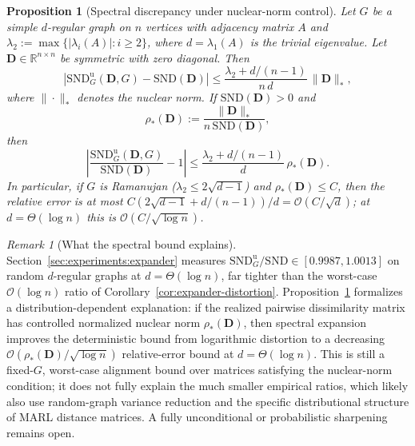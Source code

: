 \documentclass{article}
\theoremstyle{plain}
\newtheorem{proposition}[theorem]{Proposition}
\theoremstyle{definition}
\theoremstyle{remark}
\newtheorem{remark}[theorem]{Remark}
\newcommand{\R}{\mathbb{R}}
\newcommand{\SND}{\ensuremath{\mathrm{SND}}}
\newcommand{\SNDG}{\mathrm{SND}_{G}}
\newcommand{\abs}[1]{\left\lvert #1 \right\rvert}
\begin{document}
\begin{proposition}[Spectral discrepancy under nuclear-norm control]
\label{prop:spectral-nuclear-discrepancy}
Let $G$ be a simple $d$-regular graph on $n$ vertices with adjacency
matrix $A$ and
$\lambda_2:=\max\{|\lambda_i(A)|: i\geq 2\}$, where
$d=\lambda_1(A)$ is the trivial eigenvalue. Let
$\mathbf{D}\in\R^{n\times n}$ be symmetric with zero diagonal. Then
\begin{equation}
\label{eq:spectral-nuclear-absolute}
\abs{\SNDG^{\mathrm{u}}(\mathbf{D},G)-\SND(\mathbf{D})}
\leq
\frac{\lambda_2+d/(n-1)}{n\,d}\,\|\mathbf{D}\|_* ,
\end{equation}
where $\|\cdot\|_*$ denotes the nuclear norm. If $\SND(\mathbf{D})>0$
and
\[
\rho_*(\mathbf{D})
:=
\frac{\|\mathbf{D}\|_*}{n\,\SND(\mathbf{D})},
\]
then
\begin{equation}
\label{eq:spectral-nuclear-relative}
\abs{\frac{\SNDG^{\mathrm{u}}(\mathbf{D},G)}{\SND(\mathbf{D})}-1}
\leq
\frac{\lambda_2+d/(n-1)}{d}\,\rho_*(\mathbf{D}).
\end{equation}
In particular, if $G$ is Ramanujan
($\lambda_2\leq 2\sqrt{d-1}$) and $\rho_*(\mathbf{D})\leq C$, then the
relative error is at most
$C(2\sqrt{d-1}+d/(n-1))/d=\mathcal{O}(C/\sqrt d)$; at
$d=\Theta(\log n)$ this is
$\mathcal{O}(C/\sqrt{\log n})$.
\end{proposition}

\begin{remark}[What the spectral bound explains]
\label{rem:spectral-sharpening}
Section~\ref{sec:experiments:expander} measures
$\SNDG^{\mathrm{u}}/\SND\in[0.9987,1.0013]$ on random $d$-regular
graphs at $d{=}\Theta(\log n)$, far tighter than the worst-case
$\mathcal{O}(\log n)$ ratio of
Corollary~\ref{cor:expander-distortion}.
Proposition~\ref{prop:spectral-nuclear-discrepancy} formalizes a
distribution-dependent explanation: if the realized pairwise
dissimilarity matrix has controlled normalized nuclear norm
$\rho_*(\mathbf{D})$, then spectral expansion improves the deterministic
bound from logarithmic distortion to a decreasing
$\mathcal{O}(\rho_*(\mathbf{D})/\sqrt{\log n})$ relative-error bound at
$d=\Theta(\log n)$. This is still a fixed-$G$, worst-case alignment
bound over matrices satisfying the nuclear-norm condition; it does not
fully explain the much smaller empirical ratios, which likely also use
random-graph variance reduction and the specific distributional
structure of MARL distance matrices. A fully unconditional or
probabilistic sharpening remains open.
\end{remark}
\end{document}
